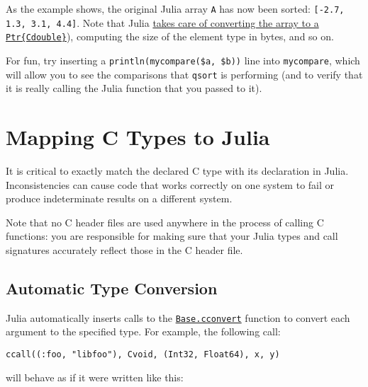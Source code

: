 As the example shows, the original Julia array \texttt{A} has now been sorted: \texttt{[-2.7, 1.3, 3.1, 4.4]}. Note that Julia \hyperlink{3709811402862932682}{takes care of converting the array to a \texttt{Ptr\{Cdouble\}}}), computing the size of the element type in bytes, and so on.



For fun, try inserting a \texttt{println({\textquotedbl}mycompare(\$a, \$b){\textquotedbl})} line into \texttt{mycompare}, which will allow you to see the comparisons that \texttt{qsort} is performing (and to verify that it is really calling the Julia function that you passed to it).



\hypertarget{10747596823753409973}{}


\section{Mapping C Types to Julia}



It is critical to exactly match the declared C type with its declaration in Julia. Inconsistencies can cause code that works correctly on one system to fail or produce indeterminate results on a different system.



Note that no C header files are used anywhere in the process of calling C functions: you are responsible for making sure that your Julia types and call signatures accurately reflect those in the C header file.\footnotemark[2]



\hypertarget{15689505875890763631}{}


\subsection{Automatic Type Conversion}



Julia automatically inserts calls to the \hyperlink{16487788729383051927}{\texttt{Base.cconvert}} function to convert each argument to the specified type. For example, the following call:




\begin{verbatim}
ccall((:foo, "libfoo"), Cvoid, (Int32, Float64), x, y)
\end{verbatim}



will behave as if it were written like this:




